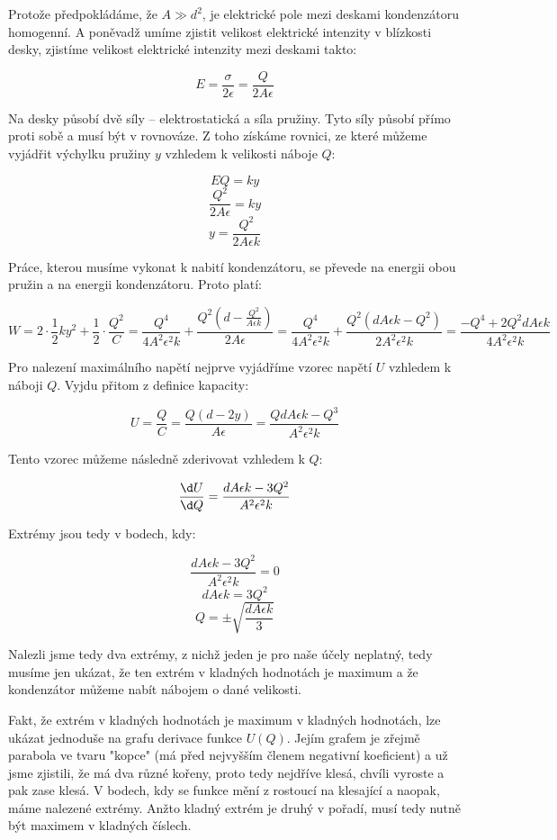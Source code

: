 \documentclass{fkssolpub}
\author{Ondřej Sedláček}
\begin{document}
Protože předpokládáme, že $A \gg d^2$, je elektrické pole mezi deskami kondenzátoru homogenní. A poněvadž umíme zjistit velikost elektrické intenzity v blízkosti desky, zjistíme velikost elektrické intenzity mezi deskami takto:

\[
	E = \frac{\sigma}{2 \epsilon} = \frac{Q}{2 A \epsilon}
\]

Na desky působí dvě síly -- elektrostatická a síla pružiny. Tyto síly působí přímo proti sobě a musí být v rovnováze. Z toho získáme rovnici, ze které můžeme vyjádřit výchylku pružiny $y$ vzhledem k velikosti náboje $Q$:

\[
	E Q = k y
\]
\[
	\frac{Q^2}{2 A \epsilon} = k y
\]
\[
	y = \frac{Q^2}{2 A \epsilon k}
\]

Práce, kterou musíme vykonat k nabití kondenzátoru, se převede na energii obou pružin a na energii kondenzátoru. Proto platí:

\[
	W = 2 \cdot \frac{1}{2} k y^2 + \frac{1}{2} \cdot \frac{Q^2}{C}
	= \frac{Q^4}{4 A^2 \epsilon^2 k} + \frac{Q^2 (d - \frac{Q^2}{A \epsilon k})}{2 A \epsilon}
	= \frac{Q^4}{4 A^2 \epsilon^2 k} + \frac{Q^2 (d A \epsilon k - Q^2)}{2 A^2 \epsilon^2 k}
	= \frac{- Q^4 + 2 Q^2 d A \epsilon k}{4 A^2 \epsilon^2 k}
\]

Pro nalezení maximálního napětí nejprve vyjádříme vzorec napětí $U$ vzhledem k náboji $Q$. Vyjdu přitom z definice kapacity:

\[
	U = \frac{Q}{C} = \frac{Q (d - 2y)}{A \epsilon} = \frac{Q d A \epsilon k - Q^3}{A^2 \epsilon^2 k}
\]

Tento vzorec můžeme následně zderivovat vzhledem k $Q$:

\[
	\frac{\d U}{\d Q} = \frac{d A \epsilon k - 3 Q^2}{A^2 \epsilon^2 k}
\]

Extrémy jsou tedy v bodech, kdy:

\[
	\frac{d A \epsilon k - 3 Q^2}{A^2 \epsilon^2 k} = 0
\]
\[
	d A \epsilon k = 3 Q^2
\]
\[
	Q = \pm \sqrt{\frac{d A \epsilon k}{3}}
\]

Nalezli jsme tedy dva extrémy, z nichž jeden je pro naše účely neplatný, tedy musíme jen ukázat, že ten extrém v kladných hodnotách je maximum a že kondenzátor můžeme nabít nábojem o dané velikosti.

Fakt, že extrém v kladných hodnotách je maximum v kladných hodnotách, lze ukázat jednoduše na grafu derivace funkce $U(Q)$. Jejím grafem je zřejmě parabola ve tvaru "kopce" (má před nejvyšším členem negativní koeficient) a už jsme zjistili, že má dva různé kořeny, proto tedy nejdříve klesá, chvíli vyroste a pak zase klesá. V bodech, kdy se funkce mění z rostoucí na klesající a naopak, máme nalezené extrémy. Anžto kladný extrém je druhý v pořadí, musí tedy nutně být maximem v kladných číslech.
\end{document}
